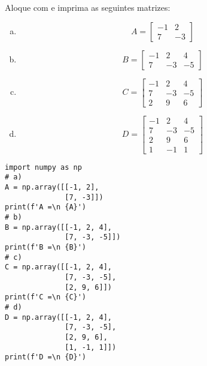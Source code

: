 \begin{exer}
  Aloque com {\PYTHONnumpyDOTarray} e imprima as seguintes matrizes:
  \begin{enumerate}[a)]
  \item
    \begin{equation}
      A =
      \begin{bmatrix}
        -1 & 2\\
        7 & -3
      \end{bmatrix}
    \end{equation}
  \item
    \begin{equation}
      B =
      \begin{bmatrix}
        -1 & 2 & 4\\
        7 & -3 & -5 
      \end{bmatrix}
    \end{equation}
  \item
    \begin{equation}
      C =
      \begin{bmatrix}
        -1 & 2 & 4\\
        7 & -3 & -5\\
        2 & 9 & 6
      \end{bmatrix}
    \end{equation}
  \item
    \begin{equation}
      D =
      \begin{bmatrix}
        -1 & 2 & 4\\
        7 & -3 & -5\\
        2 & 9 & 6\\
        1 & -1 & 1
      \end{bmatrix}
    \end{equation}
  \end{enumerate}
\end{exer}
\begin{resp}

\begin{lstlisting}
import numpy as np
# a)
A = np.array([[-1, 2],
              [7, -3]])
print(f'A =\n {A}')
# b)
B = np.array([[-1, 2, 4],
              [7, -3, -5]])
print(f'B =\n {B}')
# c)
C = np.array([[-1, 2, 4],
              [7, -3, -5],
              [2, 9, 6]])
print(f'C =\n {C}')
# d)
D = np.array([[-1, 2, 4],
              [7, -3, -5],
              [2, 9, 6],
              [1, -1, 1]])
print(f'D =\n {D}')
\end{lstlisting}

\end{resp}

